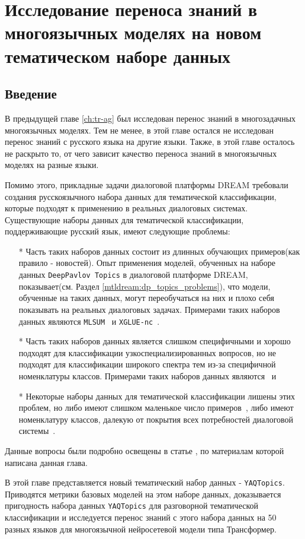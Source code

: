 \chapter{Исследование переноса знаний в многоязычных моделях на новом тематическом наборе данных}
\section{Введение}
В предыдущей главе \ref{ch:tr-ag} был исследован перенос знаний в многозадачных многоязычных моделях. Тем не менее, в этой главе остался не исследован перенос знаний с русского языка на другие языки. Также, в этой главе осталось не раскрыто то, от чего зависит качество переноса знаний в многоязычных моделях на разные языки.

Помимо этого, прикладные задачи диалоговой платформы DREAM требовали создания русскоязычного набора данных для тематической классификации, которые подходят к применению в реальных диалоговых системах. Существующие наборы данных для тематической классификации, поддерживающие русский язык, имеют следующие проблемы:
\begin{itemize}
    \item[*] Часть таких наборов данных состоит из длинных обучающих примеров(как правило - новостей). Опыт применения моделей, обученных на наборе данных \texttt{DeepPavlov Topics} в диалоговой платформе DREAM, показывает(см. Раздел \ref{mtldream:dp_topics_problems}), что модели, обученные на таких данных, могут переобучаться на них и плохо себя показывать на реальных диалоговых задачах. Примерами таких наборов данных являются \texttt{MLSUM}~\cite{mlsum} и \texttt{XGLUE-nc}~\cite{xglue}.
    \item[*] Часть таких наборов данных является слишком специфичными и хорошо подходят для классификации узкоспециализированных вопросов, но не подходят для классификации широкого спектра тем из-за специфичной номенклатуры классов.  Примерами таких наборов данных являются~\cite{healthcare_facilities_reviews} и  ~\cite{pstu}
    \item[*] Некоторые наборы данных для тематической классификации лишены этих проблем, но либо имеют слишком маленькое число примеров~\cite{chatbotru}, либо имеют номенклатуру классов, далекую от покрытия всех потребностей диалоговой системы~\cite{massive}.
\end{itemize}
Данные вопросы были подробно освещены в статье \cite{rutopics}, по материалам которой написана данная глава. 

В этой главе представляется новый тематический набор данных - \texttt{YAQTopics}. Приводятся метрики базовых моделей на этом наборе данных, доказывается пригодность набора данных \texttt{YAQTopics} для разговорной тематической классификации и исследуется перенос знаний с этого набора данных на 50 разных языков для многоязычной нейросетевой модели типа Трансформер. %

